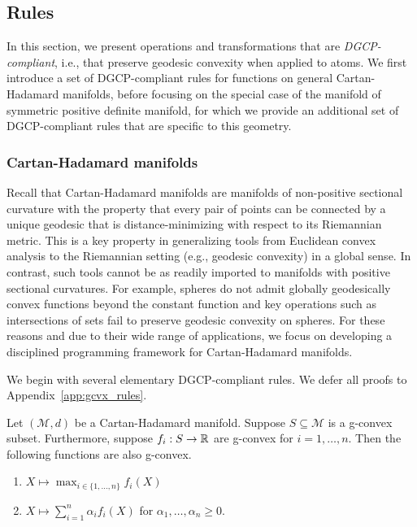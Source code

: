 \documentclass[twoside,11pt]{article}
\begin{document}
\subsection{Rules}
In this section, we present operations and transformations that are \emph{DGCP-compliant}, i.e., that preserve geodesic convexity when applied to atoms. 
We first introduce a set of DGCP-compliant rules for functions on general Cartan-Hadamard manifolds, before focusing on the special case of the manifold of symmetric positive definite manifold, for which we provide an additional set of DGCP-compliant rules that are specific to this geometry.


\subsubsection{Cartan-Hadamard manifolds}
Recall that Cartan-Hadamard manifolds are manifolds of non-positive sectional curvature with the property that every pair of points can be connected by a unique geodesic that is distance-minimizing with respect to its Riemannian metric. This is a key property in generalizing tools from Euclidean convex analysis to the Riemannian setting (e.g., geodesic convexity) in a global sense. In contrast, such tools cannot be as readily imported to manifolds with positive sectional curvatures. For example, spheres do not admit globally geodesically convex functions beyond the constant function and key operations such as intersections of sets fail to preserve geodesic convexity on spheres. For these reasons and due to their wide range of applications, we focus on developing a disciplined programming framework for Cartan-Hadamard manifolds.

We begin with several elementary DGCP-compliant rules. We defer all proofs to Appendix~\ref{app:gcvx_rules}.

\begin{prop}\label{prop:coniccomb_pwmax}
    Let $(\mathcal{M}, d)$ be a Cartan-Hadamard manifold. Suppose $S \subseteq \mathcal{M}$ is a g-convex subset. Furthermore, suppose $f_i: S \to \mathbb{R}$ are g-convex for $i= 1, \ldots, n$. Then the following functions are also g-convex.
     \begin{enumerate}
        \item $X \mapsto \max_{i \in \{1,\ldots, n\}}f_i(X)$
        \item $X \mapsto \sum_{i=1}^n \alpha_i f_i(X) $ for $\alpha_1, \ldots, \alpha_n  \geq 0$.
    \end{enumerate}
\end{prop}
\end{document}
